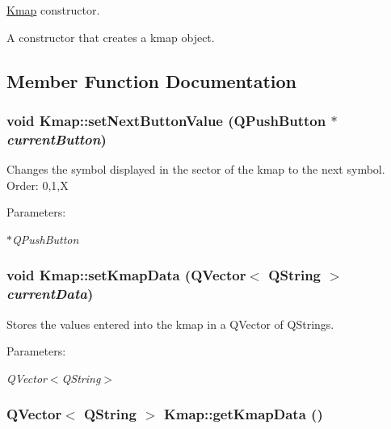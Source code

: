 \hyperlink{classKmap}{Kmap} constructor. 

A constructor that creates a kmap object. 

\subsection{Member Function Documentation}
\hypertarget{classKmap_219aee8c1737391460c45c70db9af238}{
\subsubsection[setNextButtonValue]{\setlength{\rightskip}{0pt plus 5cm}void Kmap::setNextButtonValue (QPushButton $\ast$ {\em currentButton})}}
\label{classKmap_219aee8c1737391460c45c70db9af238}


Changes the symbol displayed in the sector of the kmap to the next symbol. Order: 0,1,X \begin{Desc}
\item[Parameters:]
\begin{description}
\item[{\em $\ast$QPushButton}]\end{description}
\end{Desc}
\hypertarget{classKmap_a1f56e49fd450b8ddcc3000ae897dc9b}{
\subsubsection[setKmapData]{\setlength{\rightskip}{0pt plus 5cm}void Kmap::setKmapData (QVector$<$ QString $>$ {\em currentData})}}
\label{classKmap_a1f56e49fd450b8ddcc3000ae897dc9b}


Stores the values entered into the kmap in a QVector of QStrings. \begin{Desc}
\item[Parameters:]
\begin{description}
\item[{\em QVector$<$QString$>$}]\end{description}
\end{Desc}
\hypertarget{classKmap_f04c56bae31de2f5419b8b97b4e92433}{
\subsubsection[getKmapData]{\setlength{\rightskip}{0pt plus 5cm}QVector$<$ QString $>$ Kmap::getKmapData ()}}
\label{classKmap_f04c56bae31de2f5419b8b97b4e92433}


